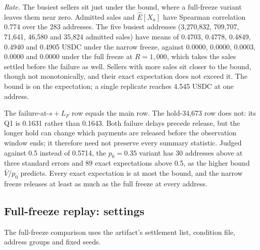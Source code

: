 \documentclass[10pt,a4paper]{article}
\theoremstyle{plain}
\theoremstyle{remark}
\begin{document}
\emph{Rate.} The busiest sellers sit just under the bound, where a full-freeze variant leaves them near zero. Admitted sales and $\hat E[X_a]$ have Spearman correlation 0.774 over the 283 addresses. The five busiest addresses (3,270,832, 709,707, 71,641, 46,580 and 35,824 admitted sales) have means of 0.4703, 0.4778, 0.4849, 0.4940 and 0.4905 USDC under the narrow freeze, against 0.0000, 0.0000, 0.0003, 0.0000 and 0.0000 under the full freeze at $R=1{,}000$, which takes the sales settled before the failure as well. Sellers with more sales sit closer to the bound, though not monotonically, and their exact expectation does not exceed it. The bound is on the expectation; a single replicate reaches 4.545 USDC at one address.





The failure-at-$s+L_F$ row equals the main row. The hold-34,673 row does not: its Q1 is 0.1631 rather than 0.1643. Both failure delays precede release, but the longer hold can change which payments are released before the observation window ends; it therefore need not preserve every summary statistic. Judged against 0.5 instead of 0.5714, the $p_0=0.35$ variant has 30 addresses above at three standard errors and 89 exact expectations above 0.5, as the higher bound $\bar V/p_0$ predicts. Every exact expectation is at most the bound, and the narrow freeze releases at least as much as the full freeze at every address.



\subsection{Full-freeze replay: settings}
\label{sec:fullreg}

The full-freeze comparison uses the artifact's settlement list, condition file, address groups and fixed seeds.
\end{document}

